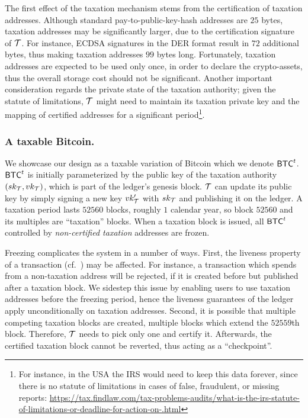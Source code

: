 The first effect of the taxation mechanism stems from the certification of
taxation addresses.  Although standard pay-to-public-key-hash addresses are
$25$ bytes, taxation addresses may be significantly larger, due to the
certification signature of $\taxAuth$. For instance, ECDSA signatures in the
DER format result in $72$ additional bytes, thus making taxation addresses $99$
bytes long. Fortunately, taxation addresses are expected to be used only once,
in order to declare the crypto-assets, thus the overall storage cost should not
be significant.  Another important consideration regards the private state of
the taxation authority; given the statute of limitations, $\taxAuth$ might need
to maintain its taxation private key and the mapping of certified addresses for
a significant period\footnote{For instance, in the USA the IRS would need to
keep this data forever, since there is no statute of limitations in cases of
false, fraudulent, or missing reports:
\url{https://tax.findlaw.com/tax-problems-audits/what-is-the-irs-statute-of-limitations-or-deadline-for-action-on-.html}}.

\subsubsection{A taxable Bitcoin.}

We showcase our design as a taxable variation of Bitcoin which we denote
$\taxBtc$. $\taxBtc$ is initially parameterized by the public key of the
taxation authority $\keypair[\taxAuth]$, which is part of the ledger's genesis
block.  $\taxAuth$ can update its public key by simply signing a new key
$\verifykey_\taxAuth'$ with $\signkey_\taxAuth$ and publishing it on the
ledger. A taxation period lasts $52560$ blocks, \ie roughly $1$
calendar year, so block $52560$ and its multiples are ``taxation'' blocks.
When a taxation block is issued, all $\taxBtc$ controlled by \emph{non-certified
taxation} addresses are frozen.

Freezing complicates the system in a number of ways. First, the liveness
property of a transaction (cf.~\cite{EC:GarKiaLeo15}) may be affected. For
instance, a transaction which spends from a non-taxation address will be
rejected, if it is created before but published after a taxation block. We
sidestep this issue by enabling users to use taxation addresses before the
freezing period, hence the liveness guarantees of the ledger apply
unconditionally on taxation addresses. Second, it is possible that multiple
competing taxation blocks are created, \eg multiple blocks which extend the
$52559$th block. Therefore, $\taxAuth$ needs to pick only one and certify it.
Afterwards, the certified taxation block cannot be reverted, thus acting as a
``checkpoint''.

